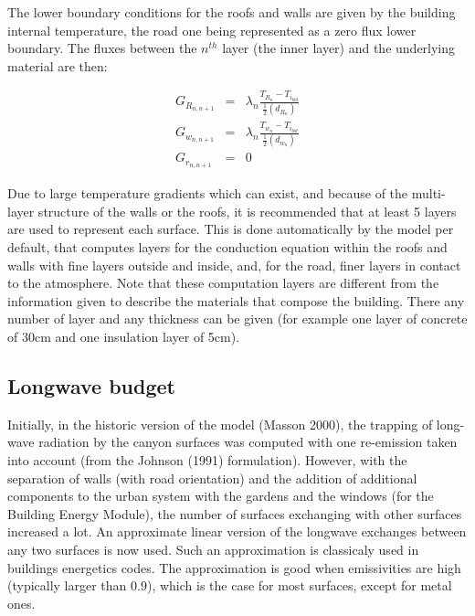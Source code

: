 The lower boundary conditions for the roofs and walls
are given by the building internal
temperature, the road one being represented as a zero flux lower boundary.
The fluxes between the $n^{th}$ layer (the inner layer)
and the underlying material are then:

\begin{eqnarray}
G_{R_{n,n+1}} &=& \lambda_{n}
\frac{T_{R_{n}}-T_{i_{bld}}}{\frac{1}{2}(d_{R_n})}\\
G_{w_{n,n+1}} &=& \lambda_{n}
\frac{T_{w_{n}}-T_{i_{bld}}}{\frac{1}{2}(d_{w_n})}\\
G_{r_{n,n+1}} &=& 0
\end{eqnarray}

Due to large temperature gradients which can exist, and because of the multi-layer structure of the walls or the roofs, it is recommended that at least 5 layers are used to represent each surface. This is done automatically by the model per default, that computes layers for the conduction equation within the roofs and walls with fine layers outside and inside, and, for the road, finer layers in contact to the atmosphere. Note that these computation layers are different from the information given to describe the materials that compose the building. There any number of layer and any thickness can be given (for example one layer of concrete of 30cm and one insulation layer of 5cm). \\



\subsection{Longwave budget\label{LW}}

Initially, in the historic version of the model (Masson 2000), the trapping of long-wave radiation by the canyon surfaces
was computed with one re-emission taken into account (from the Johnson \etal (1991)\nocite{Johnson1991} formulation). However, with the separation of walls (with road orientation) and the addition of additional components to the urban system with the gardens and the windows (for the Building Energy Module), the number of surfaces exchanging with other surfaces increased a lot. An approximate linear version of the longwave exchanges between any two surfaces is now used. Such an approximation is classicaly used in buildings energetics codes. The approximation is good when emissivities are high (typically larger than 0.9), which is the case for most surfaces, except for metal ones. \\


